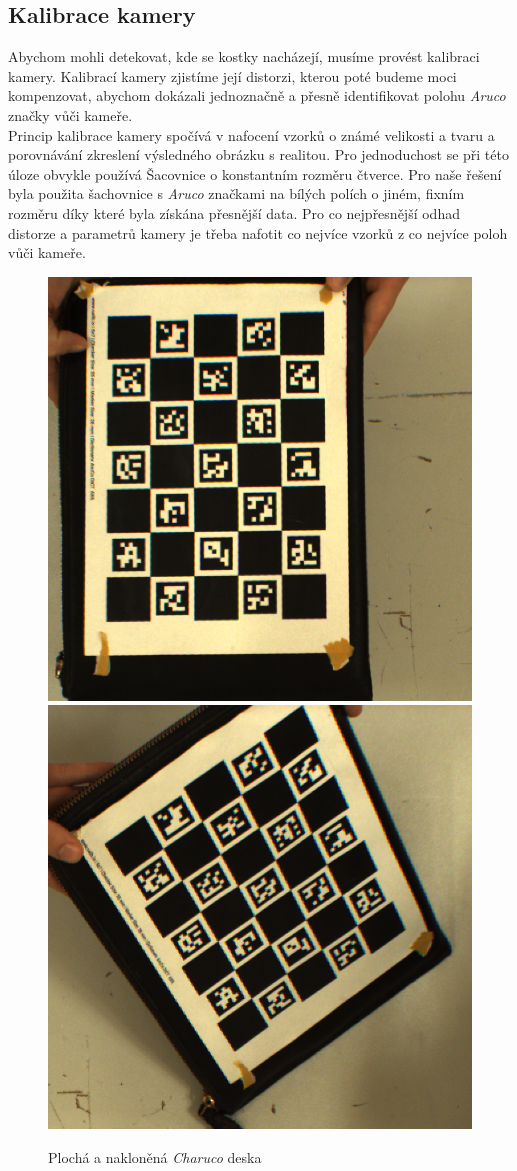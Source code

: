 \documentclass[journal,twoside,web]{ieeecolor}
\begin{document}
        \subsection{Kalibrace kamery}
            Abychom mohli detekovat, kde se kostky nacházejí, musíme provést kalibraci kamery. Kalibrací
            kamery zjistíme její distorzi, kterou poté budeme moci kompenzovat, abychom dokázali jednoznačně
            a přesně identifikovat polohu \textit{Aruco} značky vůči kameře.\\
            Princip kalibrace kamery spočívá v nafocení vzorků o známé velikosti a tvaru a porovnávání
            zkreslení výsledného obrázku s realitou. Pro jednoduchost se při této úloze obvykle používá
            Šacovnice o konstantním rozměru čtverce. Pro naše řešení byla použita šachovnice
            s \textit{Aruco} značkami na bílých polích o jiném, fixním rozměru díky které byla získána
            přesnější data. Pro co nejpřesnější odhad distorze a parametrů kamery je třeba nafotit co nejvíce
            vzorků z co nejvíce poloh vůči kameře.
            \begin{figure}[h!]
                \centering
                \includegraphics[width=0.45\linewidth]{images/CharucoFlat.png}
                \includegraphics[width=0.45\linewidth]{images/CharucoSkewed.png}
                \caption{Plochá a nakloněná \textit{Charuco} deska}
                \label{fig:CharucoBoard}
            \end{figure}\\
\end{document}
